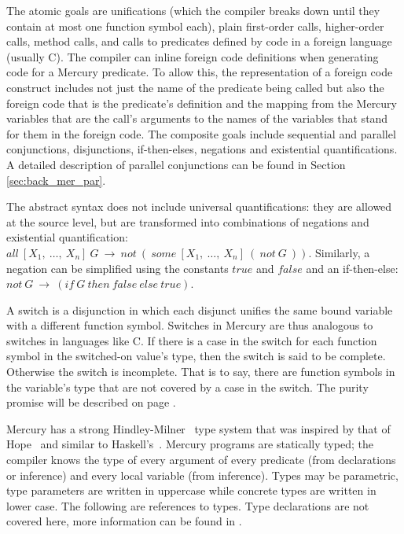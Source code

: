 \noindent
The atomic goals are unifications
(which the compiler breaks down until they contain
at most one function symbol each),
plain first-order calls,
higher-order calls,
method calls,
and calls to predicates defined by code in a foreign language (usually C).
The compiler can inline foreign code definitions when generating code
for a Mercury predicate.
To allow this, the representation of a foreign code construct includes
not just the name of the predicate being called
but also the foreign code that is the predicate's definition
and the mapping from the Mercury variables that are the call's arguments
to the names of the variables that stand for them in the foreign code.
The composite goals include
sequential and parallel conjunctions,
disjunctions, if-then-elses, negations and existential quantifications.
A detailed description of parallel conjunctions can be found in Section
\ref{sec:back_mer_par}.

The abstract syntax does not include universal quantifications:
they are allowed at the source level,
but are transformed into combinations of negations and existential quantification:
$all~[X_1,~\ldots,~X_n]~G~\rightarrow~not~(~some~[X_1,~\ldots,~X_n]~(~not~G~))$.
Similarly,
a negation can be simplified using the constants $true$ and $false$ and an
if-then-else:
$not~G~\rightarrow~(if~G~then~false~else~true)$.

A switch is a disjunction in which
each disjunct unifies the same bound variable
with a different function symbol.
Switches in Mercury are thus analogous to switches in languages like C.
If there is a case in the switch for each function symbol in the
switched-on value's type, then the switch is said to be complete.
Otherwise the switch is incomplete.
That is to say,
there are function symbols in the variable's type that are not covered
by a case in the switch.
The purity promise will be described on page \pageref{page:purity}.

Mercury has a strong Hindley-Milner~\citep{hindley69:types,milner78:types} type
system that was inspired by that of Hope~\citep{hope_types}
and similar to Haskell's~\citep{haskell98}.
Mercury programs are statically typed; the compiler knows the type of every
argument of every predicate (from declarations or inference) and every local
variable (from inference).
Types may be parametric,
type parameters are written in uppercase while
concrete types are written in lower case.
The following are references to types.
Type declarations are not covered here,
more information can be found in \citet{mercury_refman}.

